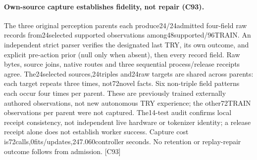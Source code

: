\documentclass{article}
\begin{document}
\paragraph{Own-source capture establishes fidelity, not repair (C93).}
The three original perception parents each produce24/24admitted four-field raw
records from24selected supported observations among48supported/96TRAIN.
An independent strict parser verifies the designated last TRY, its own outcome,
and explicit pre-action prior (null only when absent), then every record field.
Raw bytes, source joins, native routes and three sequential process/release
receipts agree. The24selected sources,24triples and24raw targets are shared
across parents: each target repeats three times, not72novel facts. Six
non-triple field patterns each occur four times per parent. These are previously
trained externally authored observations, not new autonomous TRY experience;
the other72TRAIN observations per parent were not captured. The14-test audit
confirms local receipt consistency, not independent live hardware or tokenizer
identity; a release receipt alone does not establish worker success.
Capture cost is72calls,0fits/updates,247.060controller seconds. No retention
or replay-repair outcome follows from admission. [C93]
\end{document}

